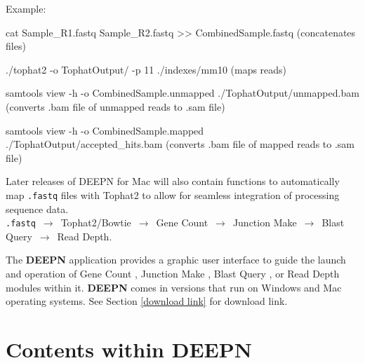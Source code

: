 \documentclass[11pt,fleqn]{book} %
\newcommand{\GeneCount}{{\color{Red} Gene Count }}
\newcommand{\JunctionMake}{{\color{Blue} Junction Make }}
\newcommand{\BlastQuery}{{\color{ForestGreen} Blast Query }}
\newcommand{\ReadDepth}{{\color{Bittersweet} Read Depth }}
\newcommand{\DEEPN}{\textbf{DEEPN }}
\begin{document}
    Example:

      cat Sample\_R1.fastq Sample\_R2.fastq >> CombinedSample.fastq  
                 (concatenates files)

      ./tophat2 -o TophatOutput/ -p 11 ./indexes/mm10 
                 (maps reads)

      samtools view -h -o CombinedSample.unmapped   ./TophatOutput/unmapped.bam 
                 (converts .bam file of unmapped reads to .sam file)

      samtools view -h -o CombinedSample.mapped   ./TophatOutput/accepted\_hits.bam 
                 (converts .bam file of mapped reads to .sam file)


\begin{remark}
	Later releases of DEEPN for Mac will also contain functions to automatically map \texttt{.fastq} files with Tophat2 to allow for seamless integration of processing sequence data.\\

	\texttt{.fastq} $\,\to\,$ Tophat2/Bowtie $\,\to\,$ \GeneCount $\,\to\,$ {\color{Blue} Junction Make} $\,\to\,$ {\color{ForestGreen} Blast Query} $\,\to\,$  {\color{Bittersweet} Read Depth}.  
\end{remark}


The \DEEPN application provides a graphic user interface to guide the launch and operation of \GeneCount, \JunctionMake, \BlastQuery, or \ReadDepth modules within it. \DEEPN comes in versions that run on Windows and Mac operating systems. See Section \ref{download link} for download link.

\clearpage



\section{Contents within DEEPN}
\end{document}
